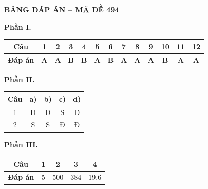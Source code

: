 
\vspace{0.3cm}
\noindent\begin{minipage}{\linewidth}
\begin{center}{\large\bfseries\color{red!80!black} BẢNG ĐÁP ÁN -- MÃ ĐỀ 494}\end{center}
\noindent\textbf{Phần I.}\par\smallskip
\begin{center}\begin{tabular}{|c|c|c|c|c|c|c|c|c|c|c|c|c|}\hline
\textbf{Câu} & 1 & 2 & 3 & 4 & 5 & 6 & 7 & 8 & 9 & 10 & 11 & 12 \\ \hline
\textbf{Đáp án} & \textbf{A} & \textbf{A} & \textbf{B} & \textbf{B} & \textbf{A} & \textbf{B} & \textbf{A} & \textbf{A} & \textbf{A} & \textbf{B} & \textbf{A} & \textbf{A} \\ \hline
\end{tabular}\end{center}
\noindent\textbf{Phần II.}\par\smallskip
\begin{center}\begin{tabular}{|c|c|c|c|c|}\hline
\textbf{Câu} & \textbf{a)} & \textbf{b)} & \textbf{c)} & \textbf{d)} \\ \hline
1 & Đ & Đ & S & Đ \\ \hline
2 & S & S & Đ & Đ \\ \hline
\end{tabular}\end{center}
\noindent\textbf{Phần III.}\par\smallskip
\begin{center}\begin{tabular}{|c|c|c|c|c|}\hline
\textbf{Câu} & 1 & 2 & 3 & 4 \\ \hline
\textbf{Đáp án} & 5 & 500 & 384 & 19,6 \\ \hline
\end{tabular}\end{center}
\end{minipage}
